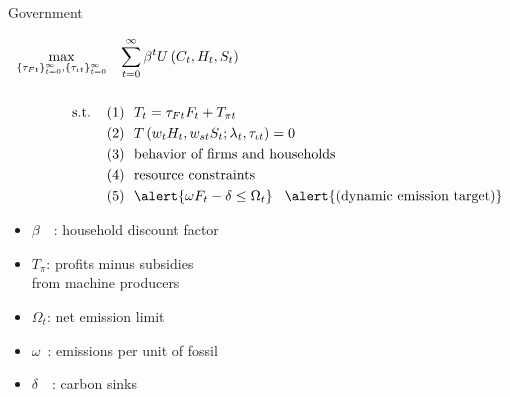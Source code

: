 \documentclass[11pt,aspectratio=169]{beamer}
\begin{document}
%
\begin{frame}{ Government}
	\hypertarget{govmod}{}
	\vspace{-4mm}
	\centering
	\begin{minipage}[t!]{1\textwidth}
		\begin{align*}
			\max_{\{\tau_{Ft}\}_{t=0}^{\infty}, \{\tau_{\iota t}\}_{t=0}^{\infty}}&\hspace{3mm} \sum_{t=0}^{\infty}\beta^t U\left(C_t,H_t, S_t\right)\\ \ \\
			\text{s.t.} \hspace{4mm}
			&{ (1)\ \ T_t={{\tau_{Ft}}}F_{t}}+T_{\pi t}\\
			&{(2)\ \ T\left(w_{t}H_{t},w_{st}S_{t}; \lambda_t, \tau_{\iota t}\right)=0}\\
			& {(3)\ \  \text{behavior of firms and households}}\\
			& {(4)\ \ \text{resource constraints} }\\
			&{(5)\ \  \alert{\omega F_t-\delta \leq\Omega_t }} \hspace{3mm} \alert{\text{(dynamic emission target)}}
		\end{align*}
	\end{minipage}
	
	\small
	\vspace{-4mm}
	\hspace{-10mm}
	\begin{minipage}[t!]{0.5\textwidth}
		\vspace{7mm}
		\begin{itemize}
			\item[] $\beta$\ \ : household discount factor\vspace{-2mm}
			\item[] $T_\pi$: profits minus subsidies \\ \hspace{5.5mm} from machine producers \vspace{0mm}
		\end{itemize}
	\end{minipage}
	\begin{minipage}[t!]{0.45\textwidth}
		\vspace{8mm}
		\begin{itemize}
			\item[] $\Omega_{t}$: net emission limit
			\vspace{-2mm}	
			\item[] $\omega$\ : emissions per unit of fossil \vspace{-0.8mm}
			\item[] $\delta$\ \ : carbon sinks \tiny{\citep{VanVuuren2018AlternativeTechnologies}}
		\end{itemize}
	\end{minipage}
	

\end{frame}
\end{document}
